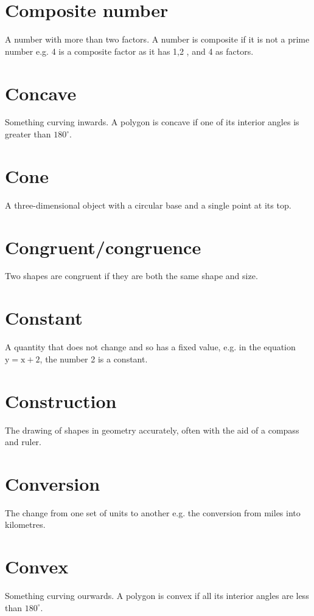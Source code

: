 \documentclass[10pt]{article}
\begin{document}
\section*{Composite number}
A number with more than two factors. A number is composite if it is not a prime number e.g. 4 is a composite factor as it has 1,2 , and 4 as factors.

\section*{Concave}
Something curving inwards. A polygon is concave if one of its interior angles is greater than $180^{\circ}$.

\section*{Cone}
A three-dimensional object with a circular base and a single point at its top.

\section*{Congruent/congruence}
Two shapes are congruent if they are both the same shape and size.

\section*{Constant}
A quantity that does not change and so has a fixed value, e.g. in the equation $\mathrm{y}=\mathrm{x}+2$, the number 2 is a constant.

\section*{Construction}
The drawing of shapes in geometry accurately, often with the aid of a compass and ruler.

\section*{Conversion}
The change from one set of units to another e.g. the conversion from miles into kilometres.

\section*{Convex}
Something curving ourwards. A polygon is convex if all its interior angles are less than $180^{\circ}$.
\end{document}
